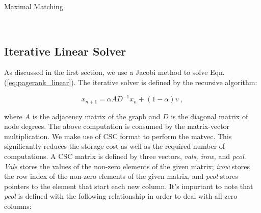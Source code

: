\documentclass[11pt]{article}
\newcommand{\noi}{\noindent}
\begin{document}
	\begin{algorithm}[H]
        \small
	\caption{Maximal Matching}\label{alg:mxm}
	\begin{algorithmic}[1]
        \\
        
        \EndParFor

        \EndIf
        \EndParFor

        \EndFor
        
        \EndProcedure
        \end{algorithmic}
        \end{algorithm} 





\subsection{Iterative Linear Solver}

As discussed in the first section, we use a Jacobi method to solve Eqn.
(\ref{eq:pagerank_linear}). The iterative solver is defined by the recursive
algorithm:

\begin{equation*}
	x_{n+1} = \alpha AD^{-1}x_{n}+(1-\alpha)v \; , 
\end{equation*}

\noi where $A$ is the adjacency matrix of the graph and $D$ is the diagonal
matrix of node degrees. The above computation is consumed by the matrix-vector
multiplication. We make use of CSC format to perform the matvec. This
significantly reduces the storage cost as well as the required number of
computations. A CSC matrix is defined by three vectors, \textit{vals, irow,} and
\textit{pcol}. \textit{Vals} stores the values of the non-zero elements of the
given matrix; \textit{irow} stores the row index of the non-zero elements of the
given matrix, and \textit{pcol} stores pointers to the element that start each
new column. It's important to note that \textit{pcol} is defined with the
following relationship in order to deal with all zero columns: 
\end{document}
